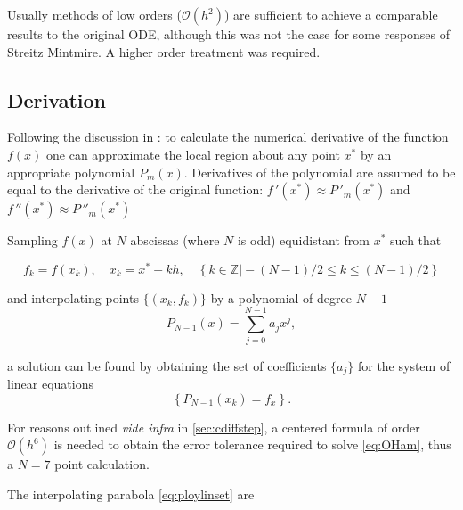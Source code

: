 Usually methods of low orders (\eg $\mathcal{O}(h^2)$) are sufficient to achieve a comparable results to the original ODE, although this was not the case for some responses of Streitz Mintmire.
A higher order treatment was required.

\subsection{Derivation}
Following the discussion in : to calculate the numerical derivative of the function $f(x)$ one can approximate the local region about any point $x^*$ by an appropriate polynomial $P_m(x)$.
Derivatives of the polynomial are assumed to be equal to the derivative of the original function: $f\,'(x^*)\approx P\,'_m(x^*)$ and $f\,''(x^*)\approx P\,''_m(x^*)$ \etc

Sampling $f(x)$ at $N$ abscissas (where $N$ is odd) equidistant from $x^*$ such that

\begin{equation}
f_k = f(x_k), \quad x_k=x^*+kh, \quad \left\{k \in \mathds{Z} \vert -(N-1)/2 \leq k \leq  (N-1)/2 \right\}
\end{equation}

and interpolating points $\{(x_k,f_k)\}$ by a polynomial of degree $N-1$
\begin{equation}
P_{N-1}(x)=\sum_{j=0}^{N-1} a_j x^j,
\end{equation}

a solution can be found by obtaining the set of coefficients $\{a_j\}$ for the system of linear equations
\begin{equation}
\left\{P_{N-1}(x_k)=f_x\right\}.
\label{eq:ploylinset}
\end{equation}

For reasons outlined \emph{vide infra} in \cref{sec:cdiffstep}, a centered formula of order $\mathcal{O}(h^6)$ is needed to obtain the error tolerance required to solve \cref{eq:OHam}, thus a $N=7$ point calculation.

The interpolating parabola \cref{eq:ploylinset} are

